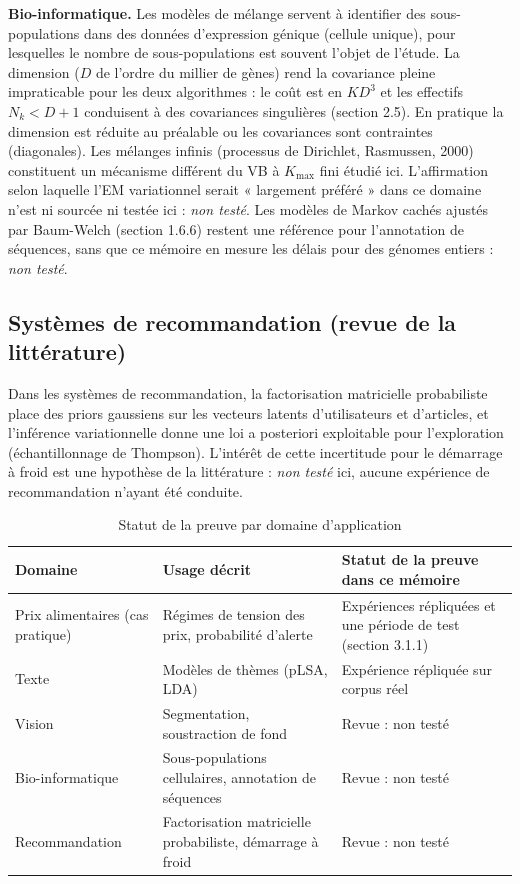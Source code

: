 \textbf{Bio-informatique. }Les modèles de mélange servent à identifier des sous-populations dans des données d'expression génique (cellule unique), pour lesquelles le nombre de sous-populations est souvent l'objet de l'étude. La dimension ($D$ de l'ordre du millier de gènes) rend la covariance pleine impraticable pour les deux algorithmes : le coût est en $KD^3$ et les effectifs $N_k < D+1$ conduisent à des covariances singulières (section 2.5). En pratique la dimension est réduite au préalable ou les covariances sont contraintes (diagonales). Les mélanges infinis (processus de Dirichlet, Rasmussen, 2000) constituent un mécanisme différent du VB à $K_{\max}$ fini étudié ici. L'affirmation selon laquelle l'EM variationnel serait « largement préféré » dans ce domaine n'est ni sourcée ni testée ici : \emph{non testé}. Les modèles de Markov cachés ajustés par Baum-Welch (section 1.6.6) restent une référence pour l'annotation de séquences, sans que ce mémoire en mesure les délais pour des génomes entiers : \emph{non testé}.


\subsection{Systèmes de recommandation (revue de la littérature)}
Dans les systèmes de recommandation, la factorisation matricielle probabiliste place des priors gaussiens sur les vecteurs latents d'utilisateurs et d'articles, et l'inférence variationnelle donne une loi a posteriori exploitable pour l'exploration (échantillonnage de Thompson). L'intérêt de cette incertitude pour le démarrage à froid est une hypothèse de la littérature : \emph{non testé} ici, aucune expérience de recommandation n'ayant été conduite.

\begin{table}[H]
\centering
\small
\setlength{\tabcolsep}{0.14cm}
\begin{tabular}{|p{3.6cm}|p{5.4cm}|p{5.2cm}|}
\hline
\textbf{Domaine} & \textbf{Usage décrit} & \textbf{Statut de la preuve dans ce mémoire} \\
\hline
Prix alimentaires (cas pratique) & Régimes de tension des prix, probabilité d'alerte & Expériences répliquées et une période de test (section 3.1.1) \\
\hline
Texte & Modèles de thèmes (pLSA, LDA) & Expérience répliquée sur corpus réel \\
\hline
Vision & Segmentation, soustraction de fond & Revue : non testé \\
\hline
Bio-informatique & Sous-populations cellulaires, annotation de séquences & Revue : non testé \\
\hline
Recommandation & Factorisation matricielle probabiliste, démarrage à froid & Revue : non testé \\
\hline
\end{tabular}
\caption{Statut de la preuve par domaine d'application}
\label{tab:3_1}
\end{table}

